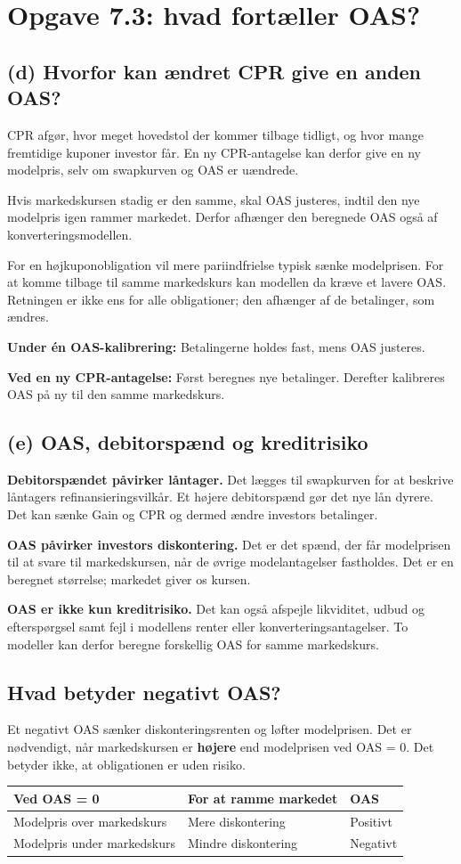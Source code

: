 \documentclass[11pt,a4paper]{article}
\newcommand{\opgave}[1]{\section*{#1}}
\newcommand{\del}[1]{\subsection*{#1}}
\begin{document}
\newpage
\opgave{Opgave 7.3: hvad fortæller OAS?}
\del{(d) Hvorfor kan ændret CPR give en anden OAS?}
CPR afgør, hvor meget hovedstol der kommer tilbage tidligt, og hvor mange fremtidige kuponer investor får. En ny CPR-antagelse kan derfor give en ny modelpris, selv om swapkurven og OAS er uændrede.

Hvis markedskursen stadig er den samme, skal OAS justeres, indtil den nye modelpris igen rammer markedet. Derfor afhænger den beregnede OAS også af konverteringsmodellen.

For en højkuponobligation vil mere pariindfrielse typisk sænke modelprisen. For at komme tilbage til samme markedskurs kan modellen da kræve et lavere OAS. Retningen er ikke ens for alle obligationer; den afhænger af de betalinger, som ændres.

\begin{tcolorbox}[title=To forskellige ændringer]
\textbf{Under én OAS-kalibrering:} Betalingerne holdes fast, mens OAS justeres.

\textbf{Ved en ny CPR-antagelse:} Først beregnes nye betalinger. Derefter kalibreres OAS på ny til den samme markedskurs.
\end{tcolorbox}

\del{(e) OAS, debitorspænd og kreditrisiko}
\textbf{Debitorspændet påvirker låntager.} Det lægges til swapkurven for at beskrive låntagers refinansieringsvilkår. Et højere debitorspænd gør det nye lån dyrere. Det kan sænke Gain og CPR og dermed ændre investors betalinger.

\textbf{OAS påvirker investors diskontering.} Det er det spænd, der får modelprisen til at svare til markedskursen, når de øvrige modelantagelser fastholdes. Det er en beregnet størrelse; markedet giver os kursen.

\textbf{OAS er ikke kun kreditrisiko.} Det kan også afspejle likviditet, udbud og efterspørgsel samt fejl i modellens renter eller konverteringsantagelser. To modeller kan derfor beregne forskellig OAS for samme markedskurs.

\del{Hvad betyder negativt OAS?}
Et negativt OAS sænker diskonteringsrenten og løfter modelprisen. Det er nødvendigt, når markedskursen er \textbf{højere} end modelprisen ved OAS = 0. Det betyder ikke, at obligationen er uden risiko.

\begin{center}\begin{tabular}{lll}\toprule
Ved OAS = 0 & For at ramme markedet & OAS\\\midrule
Modelpris over markedskurs & Mere diskontering & Positivt\\
Modelpris under markedskurs & Mindre diskontering & Negativt\\\bottomrule
\end{tabular}\end{center}
\end{document}
